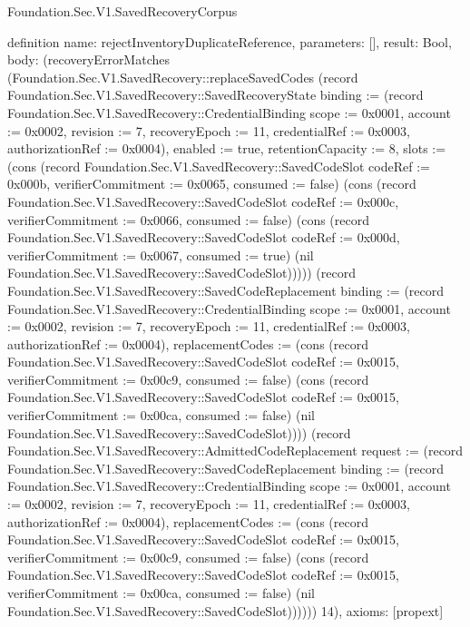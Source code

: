 \begin{lexlean}{Foundation.Sec.V1.SavedRecoveryCorpus}
\begin{semanticmodule}
definition{
  name: rejectInventoryDuplicateReference,
  parameters: [],
  result: Bool,
  body: (recoveryErrorMatches (Foundation.Sec.V1.SavedRecovery::replaceSavedCodes (record Foundation.Sec.V1.SavedRecovery::SavedRecoveryState {binding := (record Foundation.Sec.V1.SavedRecovery::CredentialBinding {scope := 0x0001, account := 0x0002, revision := 7, recoveryEpoch := 11, credentialRef := 0x0003, authorizationRef := 0x0004}), enabled := true, retentionCapacity := 8, slots := (cons (record Foundation.Sec.V1.SavedRecovery::SavedCodeSlot {codeRef := 0x000b, verifierCommitment := 0x0065, consumed := false}) (cons (record Foundation.Sec.V1.SavedRecovery::SavedCodeSlot {codeRef := 0x000c, verifierCommitment := 0x0066, consumed := false}) (cons (record Foundation.Sec.V1.SavedRecovery::SavedCodeSlot {codeRef := 0x000d, verifierCommitment := 0x0067, consumed := true}) (nil Foundation.Sec.V1.SavedRecovery::SavedCodeSlot))))}) (record Foundation.Sec.V1.SavedRecovery::SavedCodeReplacement {binding := (record Foundation.Sec.V1.SavedRecovery::CredentialBinding {scope := 0x0001, account := 0x0002, revision := 7, recoveryEpoch := 11, credentialRef := 0x0003, authorizationRef := 0x0004}), replacementCodes := (cons (record Foundation.Sec.V1.SavedRecovery::SavedCodeSlot {codeRef := 0x0015, verifierCommitment := 0x00c9, consumed := false}) (cons (record Foundation.Sec.V1.SavedRecovery::SavedCodeSlot {codeRef := 0x0015, verifierCommitment := 0x00ca, consumed := false}) (nil Foundation.Sec.V1.SavedRecovery::SavedCodeSlot)))}) (record Foundation.Sec.V1.SavedRecovery::AdmittedCodeReplacement {request := (record Foundation.Sec.V1.SavedRecovery::SavedCodeReplacement {binding := (record Foundation.Sec.V1.SavedRecovery::CredentialBinding {scope := 0x0001, account := 0x0002, revision := 7, recoveryEpoch := 11, credentialRef := 0x0003, authorizationRef := 0x0004}), replacementCodes := (cons (record Foundation.Sec.V1.SavedRecovery::SavedCodeSlot {codeRef := 0x0015, verifierCommitment := 0x00c9, consumed := false}) (cons (record Foundation.Sec.V1.SavedRecovery::SavedCodeSlot {codeRef := 0x0015, verifierCommitment := 0x00ca, consumed := false}) (nil Foundation.Sec.V1.SavedRecovery::SavedCodeSlot)))})})) 14),
  axioms: [propext]
}


\end{semanticmodule}
\end{lexlean}

